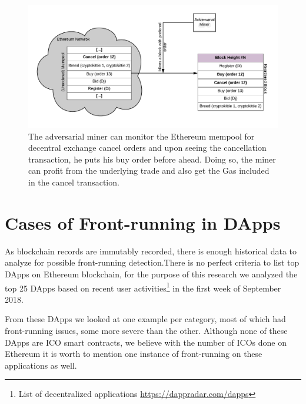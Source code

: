 \begin{figure}[h]
\centering
\includegraphics[width=0.7\linewidth]{figures/Miner_reorder_frontrun.png}
\caption{The adversarial miner can monitor the Ethereum mempool for decentral exchange cancel orders and upon seeing the cancellation transaction, he puts his buy order before ahead. Doing so, the miner can profit from the underlying trade and also get the Gas included in the cancel transaction. \label{fig:MinerFrontrunning}} 
\end{figure}




%



\section{Cases of Front-running in DApps}  
As blockchain records are immutably recorded, there is enough historical data to analyze for possible front-running detection.There is no perfect criteria to list top DApps on Ethereum blockchain, for the purpose of this research we analyzed the top 25 DApps based on recent user activities\footnote{List of decentralized applications \url{https://dappradar.com/dapps}} in the first week of September 2018.



From these DApps we looked at one example per category, most of which had front-running issues, some more severe than the other. Although none of these DApps are ICO smart contracts, we believe with the number of ICOs done on Ethereum it is worth to mention one instance of front-running on these applications as well. 




